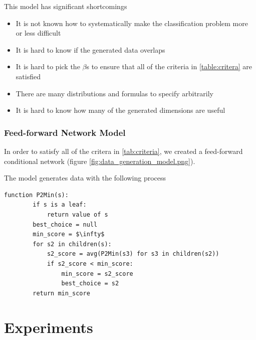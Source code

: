 \documentclass{article}
\begin{document}
This model has significant shortcomings
\begin{itemize}
    \item It is not known how to systematically make the classification problem
        more or less difficult
    \item It is hard to know if the generated data overlaps
    \item It is hard to pick the $\beta$s to ensure that all of the criteria in
        \ref{table:critera} are satisfied
    \item There are many distributions and formulas to specify arbitrarily
    \item It is hard to know how many of the generated dimensions are useful
\end{itemize}


\subsubsection{Feed-forward Network Model}

In order to satisfy all of the critera in \ref{tab:criteria}, we created a
feed-forward conditional network (figure \ref{fig:data_generation_model.png}).

The model generates data with the following process

\begin{lstlisting}[]
    function P2Min(s):
        if s is a leaf:
            return value of s
        best_choice = null
        min_score = $\infty$
        for s2 in children(s):
            s2_score = avg(P2Min(s3) for s3 in children(s2))
            if s2_score < min_score:
                min_score = s2_score
                best_choice = s2
        return min_score
\end{lstlisting}

\section{Experiments}
\end{document}
